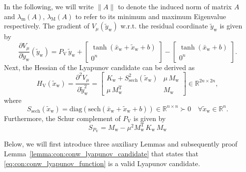 In the following, we will write $\lVert A \rVert$ to denote the induced norm of matrix $A$ and $\lambda_\mathrm{m}(A)$, $\lambda_\mathrm{M}(A)$ to refer to its minimum and maximum Eigenvalue respectively.
% 
The gradient of $V_\mu(\tilde{y}_\mathrm{w})$ w.r.t. the residual coordinate $\tilde{y}_\mathrm{w}$ is given by
\begin{equation}\label{eq:con:V_mu_gradient}
    \frac{\partial V_\mu}{\partial \tilde{y}_\mathrm{w}}(\tilde{y}_\mathrm{w}) = P_\mathrm{V} \, \tilde{y}_\mathrm{w} + 
    \begin{bmatrix}
        \tanh(\bar{x}_\mathrm{w} + \tilde{x}_\mathrm{w} + b)\\ 
        0^{n}
    \end{bmatrix} - \begin{bmatrix}
        \tanh(\bar{x}_\mathrm{w} + b)\\ 
        0^{n}
    \end{bmatrix}.
\end{equation}
Next, the Hessian of the Lyapunov candidate can be derived as
\begin{equation}\label{eq:con:V_mu_hessian}
    H_\mathrm{V}(\tilde{x}_\mathrm{w}) = \frac{\partial^2 V_\mu}{\partial \tilde{y}_\mathrm{w}^2} = \begin{bmatrix}
        K_\mathrm{w} + S_\mathrm{sech}^{2}(\tilde{x}_\mathrm{w}) & \mu \, M_\mathrm{w}\\
        \mu \, M_\mathrm{w}^\mathrm{T} & M_\mathrm{w}
    \end{bmatrix} \in \mathbb{R}^{2n \times 2n},
\end{equation}
where
\begin{equation}\label{eq:con:S_sech_definition}
    S_\mathrm{sech}(\tilde{x}_\mathrm{w}) = \mathrm{diag}(\mathrm{sech}(\bar{x}_\mathrm{w} + \tilde{x}_\mathrm{w} + b)) \in \mathbb{R}^{n \times n} \succ 0 \quad \forall \tilde{x}_\mathrm{w} \in \mathbb{R}^n.
\end{equation}
Furthermore, the Schur complement of $P_\mathrm{V}$ is given by
\begin{equation}\label{eq:con:P_V_Schur_complement}
    S_{P_\mathrm{V}} = M_\mathrm{w} - \mu^2 M_\mathrm{w}^\mathrm{T} \, K_\mathrm{w} \, M_\mathrm{w}
\end{equation}

Below, we will first introduce three auxiliary Lemmas and subsequently proof Lemma~\ref{lemma:con:conw_lyapunov_candidate} that states that \eqref{eq:con:conw_lyapunov_function} is a valid Lyapunov candidate.

